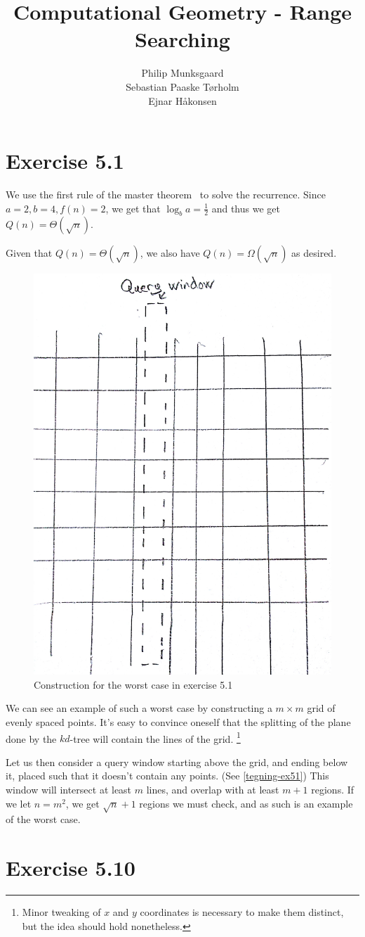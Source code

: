 \documentclass[11pt,a4paper]{article}
\title{Computational Geometry - Range Searching}
\author{Philip Munksgaard \\ Sebastian Paaske Tørholm \\ Ejnar Håkonsen}
\begin{document}
\maketitle

\section{Exercise 5.1}

We use the first rule of the master theorem~\cite{Cormen theorem 4.1}
to solve the recurrence. Since $a=2, b=4, f(n)=2$, we get that $\log_b a
= \frac{1}{2}$ and thus we get $Q(n) = \Theta(\sqrt{n})$.

Given that $Q(n) = \Theta(\sqrt{n})$, we also have $Q(n) = \Omega(\sqrt{n})$
as desired.

\begin{figure}[h!]
    \centering
    \includegraphics[width=.6\textwidth]{tegning-ex51.jpg}
    \caption{Construction for the worst case in exercise 5.1}
    \label{tegning-ex51}
\end{figure}

We can see an example of such a worst case by constructing a $m \times m$ grid
of evenly spaced points. It's easy to convince oneself that the splitting of
the plane done by the $kd$-tree will contain the lines of the grid.
\footnote{Minor tweaking of $x$ and $y$ coordinates is necessary to make
them distinct, but the idea should hold nonetheless.}

Let us then consider a query window starting above the grid, and ending below it,
placed such that it doesn't contain any points. (See \autoref{tegning-ex51})
This window will intersect at least $m$ lines, and overlap with at least $m+1$
regions. If we let $n = m^2$, we get $\sqrt{n}+1$ regions we must check, and
as such is an example of the worst case.

\section{Exercise 5.10}
\end{document}
